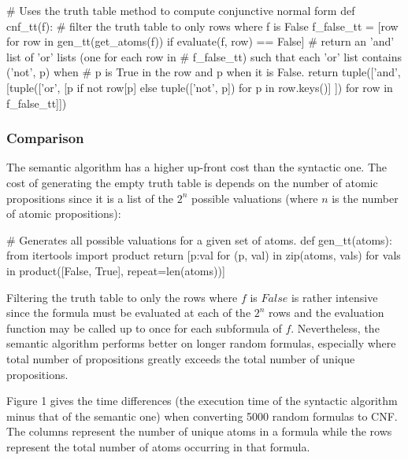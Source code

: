 \documentclass[a4paper,notitlepage]{scrartcl}
\begin{document}
\begin{code}
# Uses the truth table method to compute conjunctive normal form
def cnf_tt(f):
    # filter the truth table to only rows where f is False 
    f_false_tt = [row for row in gen_tt(get_atoms(f)) 
                  if evaluate(f, row) == False]
    # return an 'and' list of 'or' lists (one for each row in
    # f_false_tt) such that each 'or' list contains ('not', p) when
    # p is True in the row and p when it is False.
    return tuple(['and', [tuple(['or', 
        [p if not row[p] else tuple(['not', p]) for p in row.keys()] ]) 
        for row in f_false_tt]])
\end{code}

\subsubsection{Comparison}

The semantic algorithm has a higher up-front cost than the syntactic one.
The cost of generating the empty truth table is depends on the number of
   atomic propositions since 
it is a list of the $2^n$ possible valuations (where $n$ is the
        number of atomic propositions):
\begin{code}
# Generates all possible valuations for a given set of atoms.     
def gen_tt(atoms):
    from itertools import product
    return [{p:val for (p, val) in zip(atoms, vals)} for vals in 
         product([False, True], repeat=len(atoms))]
\end{code}
Filtering the truth table to only the rows where $f$ is $False$ is rather
        intensive since the formula must be evaluated at each of the
        $2^n$ rows and the evaluation function may be called up to once
        for each subformula of $f$.
Nevertheless, the semantic algorithm performs better on longer random formulas,
	especially 
        where total number of propositions greatly exceeds the total number of
        unique propositions. 

Figure 1 gives the time differences (the execution time of the
syntactic algorithm minus that of the semantic one) when converting 5000 random
formulas to CNF.
The columns represent the number of unique atoms in a formula while the rows
represent the total number of atoms occurring in that formula.

\end{document}
